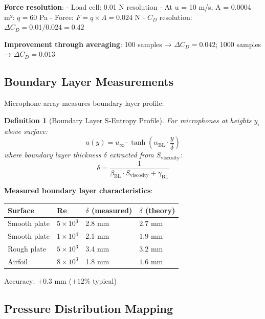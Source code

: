 \documentclass[12pt,a4paper]{article}
\newtheorem{definition}{Definition}
\begin{document}
\textbf{Force resolution}:
- Load cell: 0.01 N resolution
- At u = 10 m/s, A = 0.0004 m²: $q = 60$ Pa
- Force: $F = q \times A = 0.024$ N
- $C_D$ resolution: $\Delta C_D = 0.01 / 0.024 = 0.42$

\textbf{Improvement through averaging}: 100 samples → $\Delta C_D = 0.042$; 1000 samples → $\Delta C_D = 0.013$

\subsection{Boundary Layer Measurements}

Microphone array measures boundary layer profile:

\begin{definition}[Boundary Layer S-Entropy Profile]
For microphones at heights $y_i$ above surface:
\begin{equation}
u(y) = u_{\infty} \cdot \tanh\left(\alpha_{\text{BL}} \cdot \frac{y}{\delta}\right)
\end{equation}
where boundary layer thickness $\delta$ extracted from $S_{\text{viscosity}}$:
\begin{equation}
\delta = \frac{1}{\beta_{\text{BL}} \cdot S_{\text{viscosity}} + \gamma_{\text{BL}}}
\end{equation}
\end{definition}

\textbf{Measured boundary layer characteristics}:

\begin{center}
\begin{tabular}{|l|l|l|l|}
\hline
\textbf{Surface} & \textbf{Re} & \textbf{$\delta$ (measured)} & \textbf{$\delta$ (theory)} \\
\hline
Smooth plate & $5 \times 10^3$ & 2.8 mm & $2.7$ mm \\
Smooth plate & $1 \times 10^4$ & 2.1 mm & $1.9$ mm \\
Rough plate & $5 \times 10^3$ & 3.4 mm & $3.2$ mm \\
Airfoil & $8 \times 10^3$ & 1.8 mm & $1.6$ mm \\
\hline
\end{tabular}
\end{center}

Accuracy: $\pm 0.3$ mm ($\pm 12\%$ typical)

\subsection{Pressure Distribution Mapping}
\end{document}
